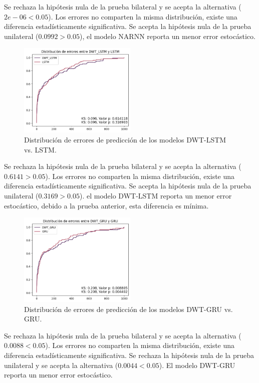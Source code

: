 Se rechaza la hipótesis nula de la prueba bilateral y se acepta la alternativa ($2e-06 < 0.05$). Los errores no comparten la misma distribución, existe una diferencia estadísticamente significativa. Se acepta la hipótesis nula de la prueba unilateral ($0.0992 > 0.05$), el modelo NARNN reporta un menor error estocástico.

\begin{figure}[H]
    \centering
    \includegraphics[width=0.5\textwidth]{Figuras/analisis/kolmogorov/DWTLSTM_LSTM.png}
    \caption{Distribución de errores de predicción de los modelos DWT-LSTM vs. LSTM.} 
    \label{fig:DWTLSTM_LSTM}
\end{figure}

Se rechaza la hipótesis nula de la prueba bilateral y se acepta la alternativa ($0.6141 > 0.05$). Los errores no comparten la misma distribución, existe una diferencia estadísticamente significativa. 
Se acepta la hipótesis nula de la prueba unilateral ($0.3169 > 0.05$). el modelo DWT-LSTM reporta un menor error estocástico, debido a la prueba anterior, esta diferencia es mínima.

\begin{figure}[H]
    \centering
    \includegraphics[width=0.5\textwidth]{Figuras/analisis/kolmogorov/DWTGRU_GRU.png}
    \caption{Distribución de errores de predicción de los modelos DWT-GRU vs. GRU.} 
    \label{fig:DWTGRU_GRU}
\end{figure}

Se rechaza la hipótesis nula de la prueba bilateral y se acepta la alternativa ($0.0088 < 0.05$). Los errores no comparten la misma distribución, existe una diferencia estadísticamente significativa. Se rechaza la hipótesis nula de la prueba unilateral y se acepta la alternativa ($0.0044 < 0.05$). El modelo DWT-GRU reporta un menor error estocástico.

